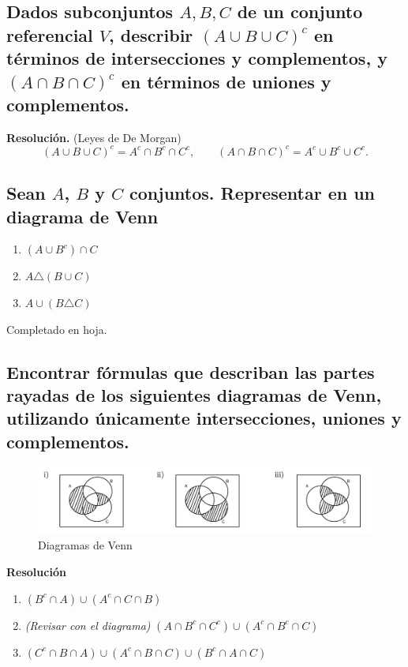 \documentclass[11pt]{article}
\begin{document}
\subsection{Dados subconjuntos \(A, B, C\) de un conjunto referencial \(V\), describir 
\((A \cup B \cup C)^{c}\) en términos de intersecciones y complementos, 
y \((A \cap B \cap C)^{c}\) en términos de uniones y complementos.}

\textbf{Resolución.} (Leyes de De Morgan)
\[
    (A \cup B \cup C)^{c} = A^{c} \cap B^{c} \cap C^{c},
    \qquad
    (A \cap B \cap C)^{c} = A^{c} \cup B^{c} \cup C^{c}.
\]

\subsection{Sean \(A\), \(B\) y \(C\) conjuntos. Representar en un diagrama de Venn}

\begin{multicols}{3}
\begin{enumerate}[label=\roman*)]
    \item \((A \cup B^{c}) \cap C\)
    \item \(A \triangle (B \cup C)\)
    \item \(A \cup (B \triangle C)\)
\end{enumerate}
\end{multicols}

Completado en hoja.

\subsection{Encontrar fórmulas que describan las partes rayadas de los siguientes diagramas de Venn, utilizando únicamente intersecciones, uniones y complementos.}
\begin{figure}[h!]
    \centering
    \includegraphics[width=1\textwidth]{image.png}
    \caption{Diagramas de Venn}
    \label{fig:venn}
\end{figure}

\textbf{Resolución}
\begin{enumerate}[label=\roman*)]
    \item \((B^{c} \cap A) \cup (A^{c} \cap C \cap B)\)
    \item \textit{(Revisar con el diagrama)} \((A \cap B^{c} \cap C^{c}) \cup (A^{c} \cap B^{c} \cap C)\)
    \item \((C^{c} \cap B \cap A) \cup (A^{c} \cap B \cap C) \cup (B^{c} \cap A \cap C)\)
\end{enumerate}
\end{document}
